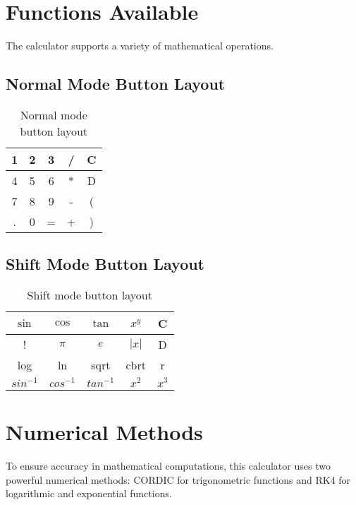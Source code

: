 \documentclass[a4paper,12pt]{article}
\begin{document}
\section{Functions Available}
The calculator supports a variety of mathematical operations.

\subsection{Normal Mode Button Layout}
\begin{table}[h]
    \centering
    \begin{tabular}{|c|c|c|c|c|}
        \hline
        1 & 2 & 3 & / & C \\
        \hline
        4 & 5 & 6 & * & D \\
        \hline
        7 & 8 & 9 & - & ( \\
        \hline
        . & 0 & = & + & ) \\
        \hline
    \end{tabular}
    \caption{Normal mode button layout}
    \label{tab:normal_buttons}
\end{table}

\subsection{Shift Mode Button Layout}
\begin{table}[h]
    \centering
    \begin{tabular}{|c|c|c|c|c|}
        \hline
        $\sin$ & $\cos$ & $\tan$ & $x^y$ & C \\
        \hline
        ! & $\pi$ & $e$ & $|x|$ & D \\
        \hline
        log & ln & sqrt & cbrt & r \\
        \hline
        $sin^{-1}$ & $cos^{-1}$ & $tan^{-1}$ & $x^2$ & $x^3$ \\
        \hline
    \end{tabular}
    \caption{Shift mode button layout}
    \label{tab:shift_buttons}
\end{table}

\newpage

\section{Numerical Methods}
To ensure accuracy in mathematical computations, this calculator uses two powerful numerical methods: CORDIC for trigonometric functions and RK4 for logarithmic and exponential functions.
\end{document}
